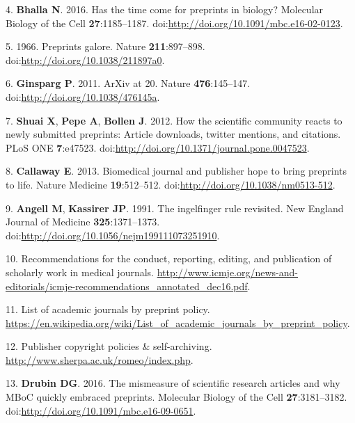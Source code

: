 \documentclass[11pt,]{article}
\begin{document}
4. \textbf{Bhalla N}. 2016. Has the time come for preprints in biology?
Molecular Biology of the Cell \textbf{27}:1185--1187.
doi:\url{http://doi.org/10.1091/mbc.e16-02-0123}.

5. 1966. Preprints galore. Nature \textbf{211}:897--898.
doi:\url{http://doi.org/10.1038/211897a0}.

6. \textbf{Ginsparg P}. 2011. ArXiv at 20. Nature \textbf{476}:145--147.
doi:\url{http://doi.org/10.1038/476145a}.

7. \textbf{Shuai X}, \textbf{Pepe A}, \textbf{Bollen J}. 2012. How the
scientific community reacts to newly submitted preprints: Article
downloads, twitter mentions, and citations. PLoS ONE \textbf{7}:e47523.
doi:\url{http://doi.org/10.1371/journal.pone.0047523}.

8. \textbf{Callaway E}. 2013. Biomedical journal and publisher hope to
bring preprints to life. Nature Medicine \textbf{19}:512--512.
doi:\url{http://doi.org/10.1038/nm0513-512}.

9. \textbf{Angell M}, \textbf{Kassirer JP}. 1991. The ingelfinger rule
revisited. New England Journal of Medicine \textbf{325}:1371--1373.
doi:\url{http://doi.org/10.1056/nejm199111073251910}.

10. Recommendations for the conduct, reporting, editing, and publication
of scholarly work in medical journals.
\url{http://www.icmje.org/news-and-editorials/icmje-recommendations_annotated_dec16.pdf}.

11. List of academic journals by preprint policy.
\url{https://en.wikipedia.org/wiki/List_of_academic_journals_by_preprint_policy}.

12. Publisher copyright policies \& self-archiving.
\url{http://www.sherpa.ac.uk/romeo/index.php}.

13. \textbf{Drubin DG}. 2016. The mismeasure of scientific research
articles and why MBoC quickly embraced preprints. Molecular Biology of
the Cell \textbf{27}:3181--3182.
doi:\url{http://doi.org/10.1091/mbc.e16-09-0651}.
\end{document}
